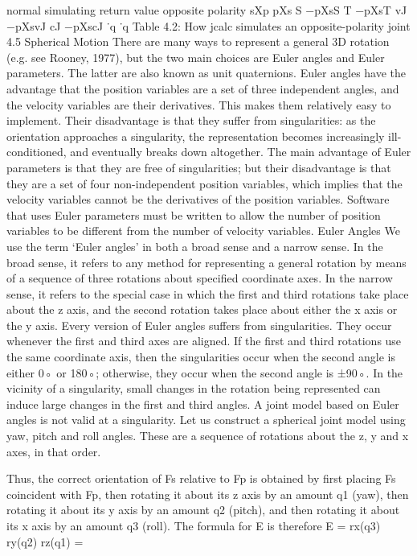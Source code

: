 normal simulating return value opposite polarity sXp pXs S −pXsS T −pXsT vJ −pXsvJ cJ −pXscJ ˙q ˙q Table 4.2: How jcalc simulates an opposite-polarity joint 4.5 Spherical Motion There are many ways to represent a general 3D rotation (e.g. see Rooney, 1977), but the two main choices are Euler angles and Euler parameters. The latter are also known as unit quaternions. Euler angles have the advantage that the position variables are a set of three independent angles, and the velocity variables are their derivatives. This makes them relatively easy to implement. Their disadvantage is that they suffer from singularities: as the orientation approaches a singularity, the representation becomes increasingly ill-conditioned, and eventually breaks down altogether. The main advantage of Euler parameters is that they are free of singularities; but their disadvantage is that they are a set of four non-independent position variables, which implies that the velocity variables cannot be the derivatives of the position variables. Software that uses Euler parameters must be written to allow the number of position variables to be different from the number of velocity variables. Euler Angles We use the term ‘Euler angles’ in both a broad sense and a narrow sense. In the broad sense, it refers to any method for representing a general rotation by means of a sequence of three rotations about specified coordinate axes. In the narrow sense, it refers to the special case in which the first and third rotations take place about the z axis, and the second rotation takes place about either the x axis or the y axis. Every version of Euler angles suffers from singularities. They occur whenever the first and third axes are aligned. If the first and third rotations use the same coordinate axis, then the singularities occur when the second angle is either 0◦ or 180◦; otherwise, they occur when the second angle is ±90◦. In the vicinity of a singularity, small changes in the rotation being represented can induce large changes in the first and third angles. A joint model based on Euler angles is not valid at a singularity. Let us construct a spherical joint model using yaw, pitch and roll angles. These are a sequence of rotations about the z, y and x axes, in that order.

Thus, the correct orientation of Fs relative to Fp is obtained by first placing Fs coincident with Fp, then rotating it about its z axis by an amount q1 (yaw), then rotating it about its y axis by an amount q2 (pitch), and then rotating it about its x axis by an amount q3 (roll). The formula for E is therefore E = rx(q3) ry(q2) rz(q1) =

